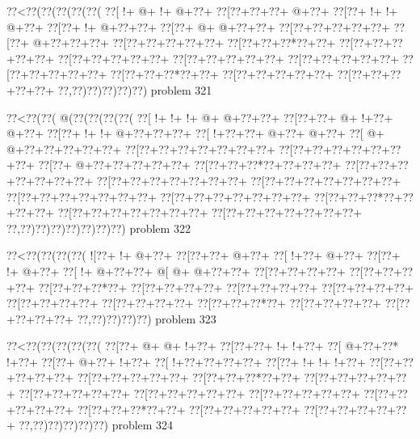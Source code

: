 \vbox{\vbox{\goo
\0??<\0??(\0??(\0??(\0??(\0??(
\0??[\- !+\- @+\- !+\- @+\0??+
\0??[\0??+\0??+\0??+\- @+\0??+
\0??[\0??+\- !+\- !+\- @+\0??+
\0??[\0??+\- !+\- @+\0??+\0??+
\0??[\0??+\- @+\- @+\0??+\0??+
\0??[\0??+\0??+\0??+\0??+\0??+
\0??[\0??+\- @+\0??+\0??+\0??+
\0??[\0??+\0??+\0??+\0??+\0??+
\0??[\0??+\0??+\0??*\0??+\0??+
\0??[\0??+\0??+\0??+\0??+\0??+
\0??[\0??+\0??+\0??+\0??+\0??+
\0??[\0??+\0??+\0??+\0??+\0??+
\0??[\0??+\0??+\0??+\0??+\0??+
\0??[\0??+\0??+\0??+\0??+\0??+
\0??[\0??+\0??+\0??*\0??+\0??+
\0??[\0??+\0??+\0??+\0??+\0??+
\0??[\0??+\0??+\0??+\0??+\0??+
\0??,\0??)\0??)\0??)\0??)\0??)
}
\hfil problem 321\hfil\break
}

\vbox{\vbox{\goo
\0??<\0??(\0??(\- @(\0??(\0??(\0??(\0??(
\0??[\- !+\- !+\- !+\- @+\- @+\0??+\0??+
\0??[\0??+\0??+\- @+\- !+\0??+\- @+\0??+
\0??[\0??+\- !+\- !+\- @+\0??+\0??+\0??+
\0??[\- !+\0??+\0??+\- @+\0??+\- @+\0??+
\0??[\- @+\- @+\0??+\0??+\0??+\0??+\0??+
\0??[\0??+\0??+\0??+\0??+\0??+\0??+\0??+
\0??[\0??+\0??+\0??+\0??+\0??+\0??+\0??+
\0??[\0??+\- @+\0??+\0??+\0??+\0??+\0??+
\0??[\0??+\0??+\0??*\0??+\0??+\0??+\0??+
\0??[\0??+\0??+\0??+\0??+\0??+\0??+\0??+
\0??[\0??+\0??+\0??+\0??+\0??+\0??+\0??+
\0??[\0??+\0??+\0??+\0??+\0??+\0??+\0??+
\0??[\0??+\0??+\0??+\0??+\0??+\0??+\0??+
\0??[\0??+\0??+\0??+\0??+\0??+\0??+\0??+
\0??[\0??+\0??+\0??*\0??+\0??+\0??+\0??+
\0??[\0??+\0??+\0??+\0??+\0??+\0??+\0??+
\0??[\0??+\0??+\0??+\0??+\0??+\0??+\0??+
\0??,\0??)\0??)\0??)\0??)\0??)\0??)\0??)
}
\hfil problem 322\hfil\break
}

\vbox{\vbox{\goo
\0??<\0??(\0??(\0??(\0??(
\- ![\0??+\- !+\- @+\0??+
\0??[\0??+\0??+\- @+\0??+
\0??[\- !+\0??+\- @+\0??+
\0??[\0??+\- !+\- @+\0??+
\0??[\- !+\- @+\0??+\0??+
\- @[\- @+\- @+\0??+\0??+
\0??[\0??+\0??+\0??+\0??+
\0??[\0??+\0??+\0??+\0??+
\0??[\0??+\0??+\0??*\0??+
\0??[\0??+\0??+\0??+\0??+
\0??[\0??+\0??+\0??+\0??+
\0??[\0??+\0??+\0??+\0??+
\0??[\0??+\0??+\0??+\0??+
\0??[\0??+\0??+\0??+\0??+
\0??[\0??+\0??+\0??*\0??+
\0??[\0??+\0??+\0??+\0??+
\0??[\0??+\0??+\0??+\0??+
\0??,\0??)\0??)\0??)\0??)
}
\hfil problem 323\hfil\break
}

\vbox{\vbox{\goo
\0??<\0??(\0??(\0??(\0??(\0??(
\0??[\0??+\- @+\- @+\- !+\0??+
\0??[\0??+\0??+\- !+\- !+\0??+
\0??[\- @+\0??+\0??*\- !+\0??+
\0??[\0??+\- @+\0??+\- !+\0??+
\0??[\- !+\0??+\0??+\0??+\0??+
\0??[\0??+\- !+\- !+\- !+\0??+
\0??[\0??+\0??+\0??+\0??+\0??+
\0??[\0??+\0??+\0??+\0??+\0??+
\0??[\0??+\0??+\0??*\0??+\0??+
\0??[\0??+\0??+\0??+\0??+\0??+
\0??[\0??+\0??+\0??+\0??+\0??+
\0??[\0??+\0??+\0??+\0??+\0??+
\0??[\0??+\0??+\0??+\0??+\0??+
\0??[\0??+\0??+\0??+\0??+\0??+
\0??[\0??+\0??+\0??*\0??+\0??+
\0??[\0??+\0??+\0??+\0??+\0??+
\0??[\0??+\0??+\0??+\0??+\0??+
\0??,\0??)\0??)\0??)\0??)\0??)
}
\hfil problem 324\hfil\break
}

